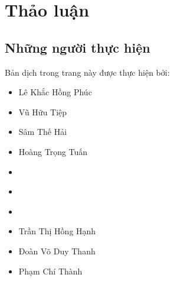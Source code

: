 \documentclass[letterpaper,11pt,english]{sphinxmanual}
\begin{document}
\section{Thảo luận\sphinxfootnotemark[37]}
\label{\detokenize{chapter_introduction/index_vn:thao-luan}}%
\begin{footnotetext}[37]\sphinxAtStartFootnote
{}
%
\end{footnotetext}\ignorespaces 


\begin{center}\end{center}




\subsection{Những người thực hiện}
\label{\detokenize{chapter_introduction/index_vn:nhung-nguoi-thuc-hien}}
Bản dịch trong trang này được thực hiện bởi:


\begin{itemize}
\item {} 
Lê Khắc Hồng Phúc

\item {} 
Vũ Hữu Tiệp

\item {} 
Sâm Thế Hải

\item {} 
Hoàng Trọng Tuấn

\end{itemize}


\begin{itemize}
\item {} 
\end{itemize}


\begin{itemize}
\item {} 
\end{itemize}


\begin{itemize}
\item {} 
\end{itemize}


\begin{itemize}
\item {} 
Trần Thị Hồng Hạnh

\end{itemize}


\begin{itemize}
\item {} 
Đoàn Võ Duy Thanh

\item {} 
Phạm Chí Thành

\end{itemize}
\end{document}
